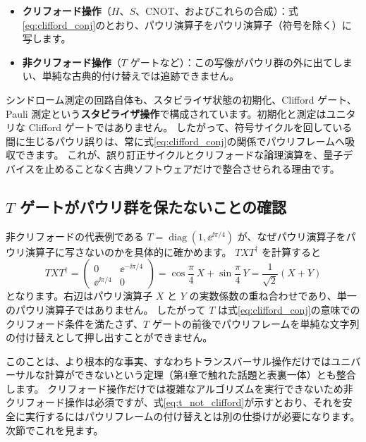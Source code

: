 \begin{itemize}
  \item \textbf{クリフォード操作}（$H$、$S$、CNOT、およびこれらの合成）：式\eqref{eq:clifford_conj}のとおり、パウリ演算子をパウリ演算子（符号を除く）に写します。
  \item \textbf{非クリフォード操作}（$T$ ゲートなど）：この写像がパウリ群の外に出てしまい、単純な古典的付け替えでは追跡できません。
\end{itemize}

シンドローム測定の回路自体も、スタビライザ状態の初期化、Clifford ゲート、Pauli 測定という\textbf{スタビライザ操作}で構成されています。初期化と測定はユニタリな Clifford ゲートではありません。
したがって、符号サイクルを回している間に生じるパウリ誤りは、常に式\eqref{eq:clifford_conj}の関係でパウリフレームへ吸収できます。
これが、誤り訂正サイクルとクリフォードな論理演算を、量子デバイスを止めることなく古典ソフトウェアだけで整合させられる理由です。

\subsection{$T$ ゲートがパウリ群を保たないことの確認}

非クリフォードの代表例である $T=\operatorname{diag}(1,\ee^{\ii\pi/4})$ が、なぜパウリ演算子をパウリ演算子に写さないのかを具体的に確かめます。
$TXT^\dagger$ を計算すると
\begin{equation}\label{eq:t_not_clifford}
  TXT^\dagger
  = \begin{pmatrix} 0 & \ee^{-\ii\pi/4} \\ \ee^{\ii\pi/4} & 0 \end{pmatrix}
  = \cos\frac{\pi}{4}\, X + \sin\frac{\pi}{4}\, Y
  = \frac{1}{\sqrt2}(X+Y)
\end{equation}
となります。右辺はパウリ演算子 $X$ と $Y$ の実数係数の重ね合わせであり、単一のパウリ演算子ではありません。
したがって $T$ は式\eqref{eq:clifford_conj}の意味でのクリフォード条件を満たさず、$T$ ゲートの前後でパウリフレームを単純な文字列の付け替えとして押し出すことができません。

このことは、より根本的な事実、すなわちトランスバーサル操作だけではユニバーサルな計算ができないという定理（第4章で触れた話題と表裏一体）とも整合します。
クリフォード操作だけでは複雑なアルゴリズムを実行できないため非クリフォード操作は必須ですが、式\eqref{eq:t_not_clifford}が示すとおり、それを安全に実行するにはパウリフレームの付け替えとは別の仕掛けが必要になります。次節でこれを見ます。

